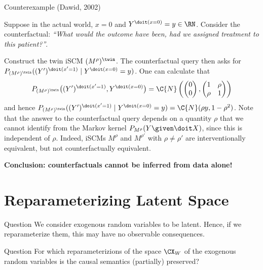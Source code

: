 \begin{frame}{Counterexample (Dawid, 2002)}
\begin{example}[2/2]
  Suppose in the actual world, $x = 0$ and $Y^{\doit(x=0)} = y \in \RN$.
  Consider the counterfactual: {\it ``What would the outcome have been, had we assigned treatment to this patient?''}.

  Construct the twin iSCM $(M^{\rho})^{\twin}$.
  The counterfactual query then asks for $P_{(M^{\rho})^\twin}((Y')^{\doit(x'=1)}\mid Y^{\doit(x=0)}=y)$. One can calculate that
$$
  P_{(M^{\rho})^\twin}\big((Y')^{\doit(x'=1)},Y^{\doit(x=0)}\big) = \C{N}\left(\begin{pmatrix}0\\ 0\end{pmatrix}, \begin{pmatrix} 1 & \rho \\ \rho & 1 \end{pmatrix}\right)
$$
  and hence $P_{(M^{\rho})^\twin}((Y')^{\doit(x'=1)} \mid Y^{\doit(x=0)}=y) = \C{N}(\rho y,1-\rho^2)$. Note that the answer to the counterfactual query depends on a quantity $\rho$ that we cannot identify from the Markov kernel $P_{M^{\rho}}(Y\given \doit X)$, since this is independent of $\rho$. 
Indeed, iSCMs $M^{\rho}$ and $M^{\rho'}$ with $\rho\neq\rho'$ are interventionally equivalent, but not counterfactually equivalent.
\end{example}
  \textbf{Conclusion: counterfactuals cannot be inferred from data alone!}
\end{frame}



\part{Reparameterizing Latent Space}
\frame{\partpage}

\begin{frame}{Question}
  We consider exogenous random variables to be latent.
  Hence, if we reparameterize them, this may have no observable consequences.

  \begin{block}{Question}
    For which reparameterizions of the space $\CX_W$ of the exogenous random variables is the causal semantics (partially) preserved?
  \end{block}
\end{frame}

